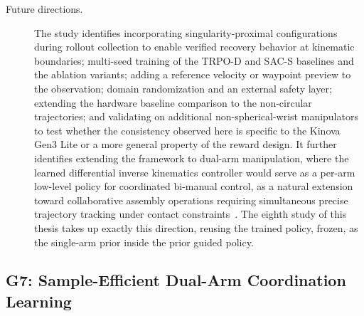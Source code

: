 \begin{description}
    \item[Future directions.] The study identifies incorporating singularity-proximal configurations
    during rollout collection to enable verified recovery behavior at kinematic boundaries;
    multi-seed training of the TRPO-D and SAC-S baselines and the ablation variants; adding a reference
    velocity or waypoint preview to the observation; domain randomization and an external safety
    layer; extending the hardware baseline comparison to the non-circular
    trajectories; and validating on additional non-spherical-wrist manipulators to test whether the
    consistency observed here is specific to the Kinova Gen3 Lite or a more general property of the
    reward design. It further identifies extending the framework to dual-arm manipulation, where the
    learned differential inverse kinematics controller would serve as a per-arm low-level policy for
    coordinated bi-manual control, as a natural extension toward collaborative assembly operations
    requiring simultaneous precise trajectory tracking under contact
    constraints~\citep{sk2025diktracking}. The eighth study of this thesis takes up exactly this
    direction, reusing the trained policy, frozen, as the single-arm prior inside the prior guided policy.
\end{description}

\subsection{G7: Sample-Efficient Dual-Arm Coordination Learning}\label{sec:concl_g7}

